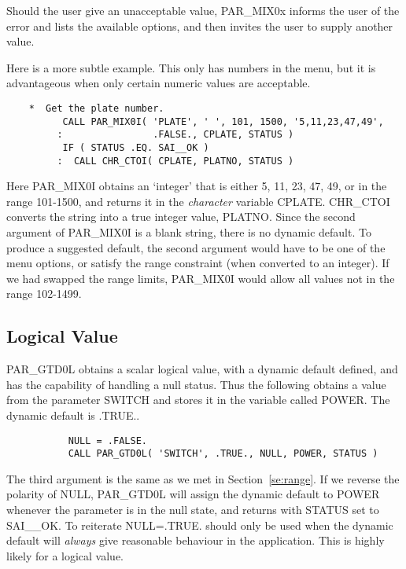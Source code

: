 \documentclass[twoside,11pt]{article}
\newcommand{\xlabel}[1]{}
\newcommand{\dash}{--}
\renewcommand{\dash}{-}
\begin{document}
Should the user give an unacceptable value, PAR\_MIX0x informs the user
of the error and lists the available options, and then invites the user
to supply another value. 

Here is a more subtle example.  This only has numbers in the menu, but
it is advantageous when only certain numeric values are acceptable.
\begin{verbatim}
    *  Get the plate number.
          CALL PAR_MIX0I( 'PLATE', ' ', 101, 1500, '5,11,23,47,49',
         :                .FALSE., CPLATE, STATUS )
          IF ( STATUS .EQ. SAI__OK ) 
         :  CALL CHR_CTOI( CPLATE, PLATNO, STATUS )
\end{verbatim}

Here PAR\_MIX0I obtains an `integer' that is either 5, 11, 23, 47, 49,
or in the range 101\dash1500, and returns it in the {\em character\/}
variable CPLATE.  CHR\_CTOI converts the string into a true integer
value, PLATNO.  Since the second argument of PAR\_MIX0I is a blank
string, there is no dynamic default.  To produce a suggested default,
the second argument would have to be one of the menu options, or satisfy
the range constraint (when converted to an integer). If we had swapped
the range limits, PAR\_MIX0I would allow all values not in the range
102\dash1499. 

\subsection{\xlabel{logical_value}Logical Value}

PAR\_GTD0L obtains a scalar logical value, with a dynamic default
defined, and has the capability of handling a null status.  Thus the
following obtains a value from the parameter SWITCH and stores it in the
variable called POWER.  The dynamic default is .TRUE..

\begin{verbatim}
           NULL = .FALSE.
           CALL PAR_GTD0L( 'SWITCH', .TRUE., NULL, POWER, STATUS )
\end{verbatim}

The third argument is the same as we met in Section~\ref{se:range}. If
we reverse the polarity of NULL, PAR\_GTD0L will assign the dynamic
default to POWER whenever the parameter is in the null state, and
returns with STATUS set to SAI\_\_OK.  To reiterate NULL=.TRUE. should
only be used when the dynamic default will {\em always\/} give
reasonable behaviour in the application.  This is highly likely for a
logical value. 
\end{document}
